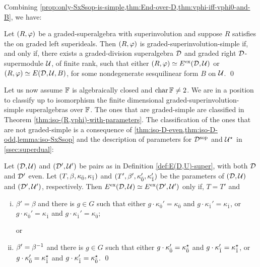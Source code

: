 
Combining \cref{prop:only-SxSsop-is-simple,thm:End-over-D,thm:vphi-iff-vphi0-and-B}, we have:

\begin{cor}\label{cor:SxSsop-with-dcc}
    Let $(R, \varphi)$ be a graded-superalgebra with superinvolution and suppose $R$ satisfies the \dcc on graded left superideals. 
    Then $(R, \varphi)$ is graded-superinvolution-simple if, and only if, there exists a graded-division superalgebra $\mathcal{D}$ and graded right $\mathcal{D}$-supermodule $\mathcal U$, of finite rank, such that either
    $(R, \varphi) \simeq E^{\mathrm{ex}} (\mathcal{D}, \mathcal U)$ or $(R, \varphi) \simeq E(\mathcal{D}, \mathcal U, B)$, for some nondegenerate sesquilinear form $B$ on $\mathcal U$. \qed
\end{cor}

Let us now assume $\mathbb{F}$ is algebraically closed and $\operatorname{char} \mathbb{F} \neq 2$. 
We are in a position to classify up to isomorphism the finite dimensional graded-superinvolution-simple  superalgebras over $\mathbb{F}$. 
The ones that are graded-simple are classified in Theorem \ref{thm:iso-(R,vphi)-with-parameters}. 
The classification of the ones that are not graded-simple is a consequence of \cref{thm:iso-D-even,thm:iso-D-odd,lemma:iso-SxSsop} and the description of parameters for $\mathcal{D}^{\mathrm{sop}}$ and $\mathcal U^\star$ in \cref{ssec:superdual}:

\begin{thm}\label{thm:iso-D-even-ExEsop}
	Let $(\mathcal{D}, \mathcal U)$ and $(\mathcal{D}', \mathcal U')$ be pairs as in Definition \ref{def:E(D,U)-super}, with both $\mathcal{D}$ and $\mathcal{D}'$ even. 
	Let $(T, \beta, \kappa_{\bar{0}}, \kappa_{\bar{1}})$ and $(T', \beta', \kappa_{\bar{0}}', \kappa_{\bar{1}}')$ be the parameters of $(\mathcal{D}, \mathcal U)$ and $(\mathcal{D}', \mathcal U')$, respectively. 
	Then $E^{\mathrm{ex}}(\mathcal{D}, \mathcal U) \simeq E^{\mathrm{ex}}(\mathcal{D}', \mathcal U')$ only if, $T=T'$ and
	\begin{enumerate}[(i)]
	    \item $\beta'=\beta$ and there is $g\in G$ such that either $g \cdot \kappa_{\bar 0}'=\kappa_{\bar 0}$ and $g \cdot \kappa_{\bar 1}'=\kappa_{\bar 1}$, or $g \cdot \kappa_{\bar 0}'=\kappa_{\bar 1}$ and $g \cdot \kappa_{\bar 1}'=\kappa_{\bar 0}$;
	    
	    or
	    \item $\beta'=\beta^{-1}$ and there is $g\in G$ such that either $g \cdot \kappa_{\bar 0}'=\kappa_{\bar 0}^\star$ and $g \cdot \kappa_{\bar 1}'=\kappa_{\bar 1}^\star$, or $g \cdot \kappa_{\bar 0}'=\kappa_{\bar 1}^\star$ and $g \cdot \kappa_{\bar 1}'=\kappa_{\bar 0}^\star$. \qed
	\end{enumerate}
\end{thm}

